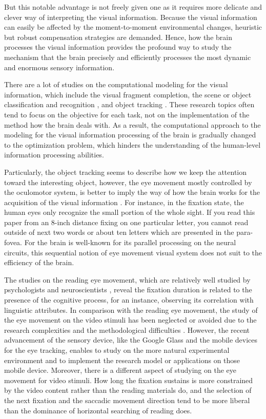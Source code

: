 \documentclass[10pt,letterpaper]{article}
\begin{document}
But this notable advantage is not freely given one as it requires more delicate and clever way of interpreting the visual information. Because the visual information can easily be affected by the moment-to-moment environmental changes, heuristic but robust compensation strategies are demanded. Hence, how the brain processes the visual information provides the profound way to study the mechanism that the brain precisely and efficiently processes the most dynamic and enormous sensory information.

There are a lot of studies on the computational modeling for the visual information, which include the visual fragment completion, the scene or object classification and recognition \cite{winn2005,lazebnik2006}, and object tracking \cite{YiWu2013}. These research topics often tend to focus on the objective for each task, not on the implementation of the method how the brain deals with. As a result, the computational approach to the modeling for the visual information processing of the brain is gradually changed to the optimization problem, which hinders the understanding of the human-level information processing abilities. 

Particularly, the object tracking seems to describe how we keep the attention toward the interesting object, however, the eye movement mostly controlled by the oculomotor system, is better to imply the way of how the brain works for the acquisition of the visual information \cite{Henderson2003}. For instance, in the fixation state, the human eyes only recognize the small portion of the whole sight. If you read this paper from an 8-inch distance fixing on one particular letter, you cannot read outside of next two words or about ten letters which are presented in the para-fovea. For the brain is well-known for its parallel processing on the neural circuits, this sequential notion of eye movement visual system does not suit to the efficiency of the brain.

The studies on the reading eye movement, which are relatively well studied by psychologists and neuroscientists \cite{Rayner1998,Reichle1998}, reveal the fixation duration is related to the presence of the cognitive process, for an instance, observing its correlation with linguistic attributes. In comparison with the reading eye movement, the study of the eye movement on the video stimuli has been neglected or avoided due to the research complexities and the methodological difficulties \cite{Tatler2011}. However, the recent advancement of the sensory device, like the Google Glass and the mobile devices for the eye tracking, enables to study on the more natural experimental environment and to implement the research model or applications on those mobile device. Moreover, there is a different aspect of studying on the eye movement for video stimuli. How long the fixation sustains is more constrained by the video content rather than the reading materials do, and the selection of the next fixation and the saccadic movement direction tend to be more liberal than the dominance of horizontal searching of reading does. 
\end{document}
